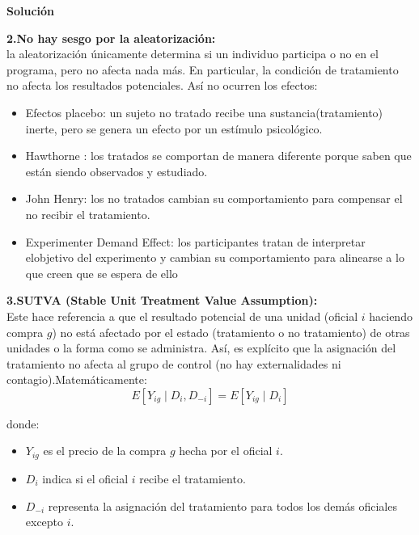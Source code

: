 \documentclass[a4paper, answers, addpoints, 11pt]{exam}
\newenvironment{solucion}{%
  \begin{mdframed}[
    backgroundcolor=blue!5,    %
    linecolor=blue!50,          %
    linewidth=2pt,              %
    leftmargin=10pt,            %
    rightmargin=10pt,           %
    topline=true,              %
    bottomline=true,            %
    roundcorner=10pt,           %
    innerleftmargin=10pt,       %
    innerrightmargin=10pt,      %
    innerbottommargin=10pt,     %
    innertopmargin=10pt         %
  ]%
  \begin{tcolorbox}[colframe=blue!50!black, colback=blue!50, coltitle=white, sharp corners=all, boxrule=1mm, width=\textwidth, halign=left, valign=center, top=0mm, bottom=0mm, left=0mm, right=0mm] \textbf{Solución} \end{tcolorbox} }{\end{mdframed}}
\begin{document}
\begin{enumerate}
\begin{solucion}
\begin{mdframed}[backgroundcolor=moraditoClaro]
 \end{mdframed}   

\textbf{2.No hay sesgo por la aleatorización:}\\ la aleatorización únicamente determina si un individuo participa o no en el programa, pero no afecta nada más. En particular,  la condición de tratamiento no afecta los resultados potenciales. Así no ocurren los efectos:
\begin{itemize}
    \item Efectos placebo: un sujeto no tratado recibe una sustancia(tratamiento) inerte, pero se genera un efecto por un estímulo psicológico.
    \item Hawthorne : los tratados se comportan de manera diferente porque saben que están siendo observados y estudiado.
    \item John Henry:  los no tratados cambian su comportamiento para compensar el no recibir el tratamiento.
    \item Experimenter Demand Effect: los participantes tratan de interpretar elobjetivo del experimento y cambian su comportamiento para alinearse a lo que creen que se espera de ello
\end{itemize}

\textbf{3.SUTVA (Stable Unit Treatment Value Assumption):}\\
Este hace referencia a que el resultado potencial de una unidad (oficial $i$ haciendo compra $g$) no está afectado por el estado (tratamiento o no tratamiento) de otras unidades o la forma como se administra. Así, es explícito que  la asignación del tratamiento no afecta al grupo de control (no hay externalidades ni contagio).Matemáticamente:
\[
E[Y_{ig} \mid D_i, D_{-i}] = E[Y_{ig} \mid D_i]
\]

donde:
\begin{itemize}
    \item \( Y_{ig} \) es el precio de la compra \( g \) hecha por el oficial \( i \).
    \item \( D_i \) indica si el oficial \( i \) recibe el tratamiento.
    \item \( D_{-i} \) representa la asignación del tratamiento para todos los demás oficiales excepto \( i \).
\end{itemize}
    \end{solucion}

   


\end{enumerate}
\end{document}
